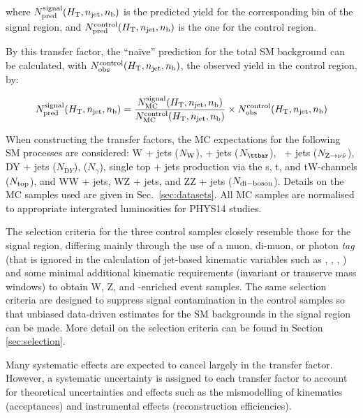where $N_{\textrm{pred}}^{\rm signal}(\mbox{$H_\text{T}$},n_{\text{jet}},n_{\text{b}})$ is the predicted yield for the corresponding bin of the signal region, and $N_{\textrm{pred}}^{\rm control}(\mbox{$H_\text{T}$},n_{\text{jet}},n_{\text{b}})$ is the one for the control region.

By this transfer factor, the ``na\"ive'' prediction for the total SM background can be calculated, with $N_{\textrm{obs}}^{\rm control}(\mbox{$H_\text{T}$},n_{\text{jet}},n_{\text{b}})$, the observed yield in the control region, by:

\begin{equation}
  \label{equ:pred-method}
  N_{\textrm{pred}}^{\rm signal}(\mbox{$H_\text{T}$},n_{\text{jet}},n_{\text{b}}) = \frac{N_{\rm MC}^{\rm
      signal}(\mbox{$H_\text{T}$},n_{\text{jet}},n_{\text{b}})}{N_{\rm MC}^{\rm
      control}(\mbox{$H_\text{T}$},n_{\text{jet}},n_{\text{b}})} \times N_{\textrm{obs}}^{\rm
    control}(\mbox{$H_\text{T}$},n_{\text{jet}},n_{\text{b}})   
\end{equation}

When constructing the transfer factors, the MC expectations for the following SM processes are considered: W + jets ($N_{\rm W}$), \ttbar + jets ($N_{\ttbar}$), \znunu\ + jets ($N_{{\text Z} \rightarrow \nu\bar{\nu}}$), DY + jets ($N_{\mathrm DY}$), \gj ($N_\gamma$), single top + jets production via the s, t, and tW-channels ($N_{\rm top}$), and WW + jets, WZ + jets, and ZZ + jets ($N_{\rm di-boson}$). Details on the MC samples used are given in Sec.~\ref{sec:datasets}. All MC samples are normalised to appropriate intergrated luminosities for PHYS14 studies.

The selection criteria for the three control samples closely resemble those for the signal region, differing mainly through the use of a muon, di-muon, or photon {\it tag} (that is ignored in the calculation of jet-based kinematic variables such as \scalht, \mht, \alphat, \etc) and some minimal additional kinematic requirements (\eg invariant or transerve mass windows) to obtain W, Z, and \ttbar-enriched event samples. The same selection criteria are designed to suppress signal contamination in the control samples so that unbiased data-driven estimates for the SM backgrounds in the signal region can be made. More detail on the selection criteria can be found in Section \ref{sec:selection}.

Many systematic effects are expected to cancel largely in the transfer factor. However, a systematic uncertainty is assigned to each transfer factor to account for theoretical uncertainties and effects such as the mismodelling of kinematics (\eg acceptances) and instrumental effects (\eg reconstruction efficiencies).

